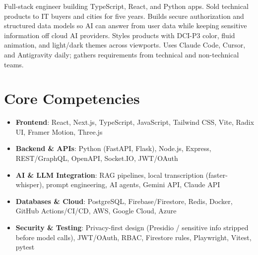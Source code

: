 \documentclass[11pt,a4paper,sans]{moderncv}
\begin{document}
\makecvtitle


\vspace{6pt}
\small{Full-stack engineer building TypeScript, React, and Python apps. Sold technical products to IT buyers and cities for five years. Builds secure authorization and structured data models so AI can answer from user data while keeping sensitive information off cloud AI providers. Styles products with DCI-P3 color, fluid animation, and light/dark themes across viewports. Uses Claude Code, Cursor, and Antigravity daily; gathers requirements from technical and non-technical teams.}


\section{Core Competencies}
\vspace{1pt}
\begin{itemize}

\item \textbf{Frontend}: React, Next.js, TypeScript, JavaScript, Tailwind CSS, Vite, Radix UI, Framer Motion, Three.js

\item \textbf{Backend \& APIs}: Python (FastAPI, Flask), Node.js, Express, REST/GraphQL, OpenAPI, Socket.IO, JWT/OAuth

\item \textbf{AI \& LLM Integration}: RAG pipelines, local transcription (faster-whisper), prompt engineering, AI agents, Gemini API, Claude API

\item \textbf{Databases \& Cloud}: PostgreSQL, Firebase/Firestore, Redis, Docker, GitHub Actions/CI/CD, AWS, Google Cloud, Azure

\item \textbf{Security \& Testing}: Privacy-first design (Presidio / sensitive info stripped before model calls), JWT/OAuth, RBAC, Firestore rules, Playwright, Vitest, pytest

\end{itemize}

\vspace{3pt}
\end{document}
